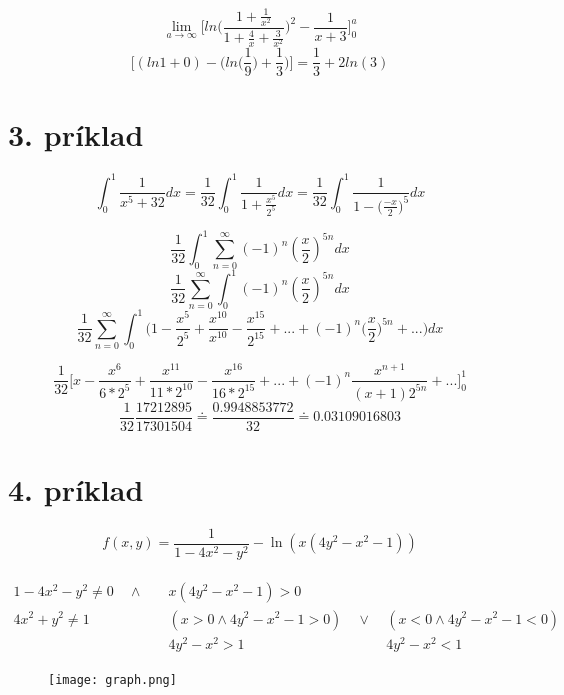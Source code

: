 \documentclass[a4paper]{article}
\begin{document}
	$$\lim_{a\to\infty}  \bigg[   ln \bigg( \frac{ 1 + \frac{1}{x^2} }{ 1+\frac{4}{x} + \frac{3}{x^2} }   \bigg)^2  - \frac{1}{x+3}  \bigg] ^a _{0}$$
	$$\bigg[ (ln1 + 0) - \bigg( ln\bigg(\frac{1}{9}\bigg)  + \frac{1}{3} \bigg)  \bigg] = \frac{1}{3} + 2ln(3)$$
	\newpage
	
	\section*{3. príklad}
	
	$$\int_{0}^{1} \frac{1}{x^5+32} dx= \frac{1}{32} \int_{0}^{1}\frac{1}{ 1+\frac{x^5}{2^5} } dx= \frac{1}{32} \int_{0}^{1} \frac{1}{ 1 - \big(\frac{-x}{2}\big)^5   }dx$$
	
	$$\frac{1}{32} \int_{0}^{1} \sum_{n=0}^{\infty} (-1)^n (\frac{x}{2})^{5n}dx$$
	$$\frac{1}{32}  \sum_{n=0}^{\infty} \int_{0}^{1}  (-1)^n (\frac{x}{2})^{5n}dx$$
	$$\frac{1}{32}  \sum_{n=0}^{\infty} \int_{0}^{1} \bigg( 1- \frac{x^5}{2^5}  + \frac{x^{10}}{x^{10}}  - \frac{x^{15}}{2^{15}} + ... + (-1)^n\bigg(\frac{x}{2}\bigg)^{5n} + ...  \bigg)dx$$
	
	$$ \frac{1}{32}  \bigg[ x - \frac{x^6}{6*2^5} + \frac{x^{11}}{11*2^{10}} - \frac{x^{16}}{16*2^{15}}  + ... +(-1)^n\frac{ x^{n+1} }{(x+1)2^{5n}} + ...\bigg]^{1}_{0} $$
	$$ \frac{1}{32} \frac{17212895}{17301504} \doteq \frac{0.9948853772}{32} \doteq 0.03109016803 $$
	\newpage
	
	\section*{4. príklad}
	
	$$f(x,y)=\frac{1}{1-4x^2-y^2}-\ln(x(4y^2-x^2-1))$$
	\\
	\begin{align*}
		1-4x^2-y^2 \neq 0\quad \wedge&\quad x(4y^2 - x^2 - 1) > 0 \\
		4x^2 + y^2 \neq 1\qquad &\quad (x > 0 \wedge 4y^2 - x^2 -1 > 0)\quad \vee&\ (x<0  \wedge 4y^2 - x^2 - 1 < 0)\\
		&\quad 4y^2 - x^2 > 1\ &\ 4y^2 - x^2 < 1
	\end{align*}
	
	\begin{figure}[h]
		\begin{center}
			\texttt{[image: graph.png]}\\
		\end{center}
	\end{figure}
	
\end{document}
